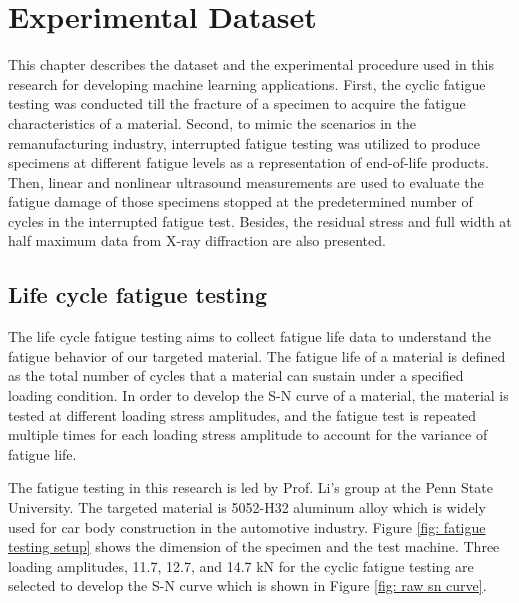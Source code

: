 \chapter{Experimental Dataset}
\label{chap: exper}
This chapter describes the dataset and the experimental procedure used in this research for developing machine learning applications. First, the cyclic fatigue testing was conducted till the fracture of a specimen to acquire the fatigue characteristics of a material. Second, to mimic the scenarios in the remanufacturing industry, interrupted fatigue testing was utilized to produce specimens at different fatigue levels as a representation of end-of-life products. Then, linear and nonlinear ultrasound measurements are used to evaluate the fatigue damage of those specimens stopped at the predetermined number of cycles in the interrupted fatigue test. Besides, the residual stress and full width at half maximum data from X-ray diffraction are also presented.

\section{Life cycle fatigue testing}
The life cycle fatigue testing aims to collect fatigue life data to understand the fatigue behavior of our targeted material. The fatigue life of a material is defined as the total number of cycles that a material can sustain under a specified loading condition. In order to develop the S-N curve of a material, the material is tested at different loading stress amplitudes, and the fatigue test is repeated multiple times for each loading stress amplitude to account for the variance of fatigue life.

The fatigue testing in this research is led by Prof. Li's group at the Penn State University. The targeted material is 5052-H32 aluminum alloy which is widely used for car body construction in the automotive industry. Figure \ref{fig: fatigue testing setup} shows the dimension of the specimen and the test machine. Three loading amplitudes, 11.7, 12.7, and 14.7 kN for the cyclic fatigue testing are selected to develop the S-N curve which is shown in Figure \ref{fig: raw sn curve}. 

